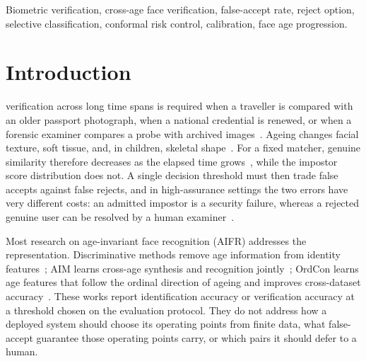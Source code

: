 \documentclass[journal]{IEEEtran}
\begin{document}
\begin{IEEEkeywords}
Biometric verification, cross-age face verification, false-accept rate, reject option, selective classification, conformal risk control, calibration, face age progression.
\end{IEEEkeywords}

\section{Introduction}
\label{sec:intro}
 verification across long time spans is required when a traveller is compared with an older passport photograph, when a national credential is renewed, or when a forensic examiner compares a probe with archived images~\cite{grother2019frvt_part3,bestrowden2018longitudinal}. Ageing changes facial texture, soft tissue, and, in children, skeletal shape~\cite{lanitis2002fgnet,deb2018child}. For a fixed matcher, genuine similarity therefore decreases as the elapsed time grows~\cite{bestrowden2018longitudinal}, while the impostor score distribution does not. A single decision threshold must then trade false accepts against false rejects, and in high-assurance settings the two errors have very different costs: an admitted impostor is a security failure, whereas a rejected genuine user can be resolved by a human examiner~\cite{phillips2018pnas}.

Most research on age-invariant face recognition (AIFR) addresses the representation. Discriminative methods remove age information from identity features~\cite{wang2018oecnn,wang2019dal,huang2021mtlface}; AIM learns cross-age synthesis and recognition jointly~\cite{zhao2022aim}; OrdCon learns age features that follow the ordinal direction of ageing and improves cross-dataset accuracy~\cite{wang2025ordcon}. These works report identification accuracy or verification accuracy at a threshold chosen on the evaluation protocol. They do not address how a deployed system should choose its operating points from finite data, what false-accept guarantee those operating points carry, or which pairs it should defer to a human.
\end{document}
